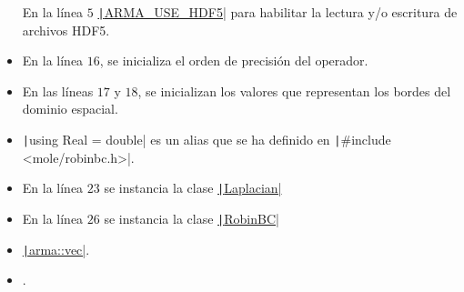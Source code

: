 \begin{problem}
\begin{itemize}
        En la línea $5$
        \href{https://arma.sourceforge.net/docs.html#config_hpp}{\texttt|ARMA_USE_HDF5|}
        para habilitar la lectura y/o escritura de archivos HDF5.

  \item

        En la línea $16$, se inicializa el orden de precisión del
        operador.

  \item

        En las líneas $17$ y $18$, se inicializan los valores que
        representan los bordes del dominio espacial.

  \item

        \texttt|using Real = double| es un alias que se ha
        definido en \texttt|#include <mole/robinbc.h>|.

  \item

        En la línea $23$ se instancia la clase
        \href{https://carlosal1015.github.io/mole_examples/api_docs/cpp/html/classLaplacian.html}{\texttt|Laplacian|}

  \item

        En la línea $26$ se instancia la clase
        \href{https://carlosal1015.github.io/mole_examples/api_docs/cpp/html/classRobinBC.html}{\texttt|RobinBC|}

  \item

        \href{https://arma.sourceforge.net/docs.html#Col}{\texttt|arma::vec|}.

  \item

        .
\end{itemize}
\noQED %
\end{problem}